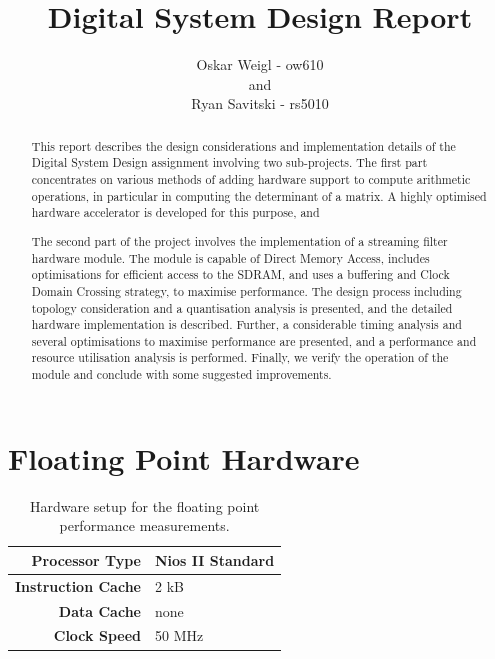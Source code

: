 \documentclass[]{article}
\title{Digital System Design Report}
\author{Oskar Weigl - ow610\\ and \\ Ryan Savitski - rs5010}
\begin{document}
\maketitle

\begin{abstract}

	This report describes the design considerations and implementation details of the Digital System Design assignment involving two sub-projects.
	The first part concentrates on various methods of adding hardware support to compute arithmetic operations, in particular in computing the determinant of a matrix.
	A highly optimised hardware accelerator is developed for this purpose, and

	The second part of the project involves the implementation of a streaming filter hardware module.
	The module is capable of Direct Memory Access, includes optimisations for efficient access to the SDRAM, and uses a buffering and Clock Domain Crossing strategy, to maximise performance.
	The design process including topology consideration and a quantisation analysis is presented, and the detailed hardware implementation is described.
	Further, a considerable timing analysis and several optimisations to maximise performance are presented, and a performance and resource utilisation analysis is performed. 
	Finally, we verify the operation of the module and conclude with some suggested improvements.

\end{abstract}
\clearpage


\tableofcontents
\clearpage


\section{Floating Point Hardware} %
\label{sec:floating_point_hardware}


\begin{table}[bp]
	\caption{Hardware setup for the floating point performance measurements.}
	\label{tab:fp_hw_setup}
	\begin{center}
		\begin{tabular}{r|l}
		\hline

		\hline
			\textbf{Processor Type} 	& Nios II Standard \\
		\hline
			\textbf{Instruction Cache}	& 2 kB \\
		\hline
			\textbf{Data Cache}			& none \\
		\hline
			\textbf{Clock Speed}		& 50 MHz \\
		\hline

		\hline
		\end{tabular}
	\end{center}
\end{table}
\end{document}
